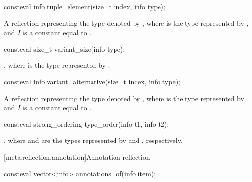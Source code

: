 %
\begin{itemdecl}
consteval info tuple_element(size_t index, info type);
\end{itemdecl}

\begin{itemdescr}
\pnum
\returns
A reflection representing
the type denoted by ,
where  is the type represented by ,
and $I$ is a constant equal to .
\end{itemdescr}

%
\begin{itemdecl}
consteval size_t variant_size(info type);
\end{itemdecl}

\begin{itemdescr}
\pnum
\returns
{},
where  is the type represented by .
\end{itemdescr}

%
\begin{itemdecl}
consteval info variant_alternative(size_t index, info type);
\end{itemdecl}

\begin{itemdescr}
\pnum
\returns
A reflection representing the type denoted by
,
where  is the type represented by 
and $I$ is a constant equal to .
\end{itemdescr}

%
\begin{itemdecl}
consteval strong_ordering type_order(info t1, info t2);
\end{itemdecl}

\begin{itemdescr}
\pnum
\returns
{},
where  and  are the types
represented by  and , respectively.
\end{itemdescr}

[meta.reflection.annotation]{Annotation reflection}

%
\begin{itemdecl}
consteval vector<info> annotations_of(info item);
\end{itemdecl}

